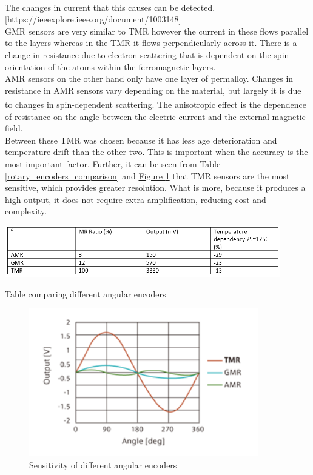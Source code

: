 \documentclass[11pt]{article}		%
\newcommand{\supercite}[1]{\textsuperscript{\cite{#1}}}		%
\newcommand{\figref}[1]{\hyperref[#1]{Figure \ref*{#1}}}    %
\newcommand{\tableref}[1]{\hyperref[#1]{Table \ref*{#1}}}     %
\begin{document}
            The changes in current that this causes can be detected.\supercite{explanation_magntoresistance1} [https://ieeexplore.ieee.org/document/1003148]
            \\
            GMR sensors are very similar to TMR however the current in these flows parallel to the layers whereas in the TMR it flows perpendicularly across it.
            There is a change in resistance due to electron scattering that is dependent on the spin orientation of the atoms within the ferromagnetic layers.
            \\
            AMR sensors on the other hand only have one layer of permalloy. 
            Changes in resistance in AMR sensors vary depending on the material, but largely it is due to changes in spin-dependent scattering.\supercite{explanation_magntoresistance2}
            The anisotropic effect is the dependence of resistance on the angle between the electric current and the external magnetic field.
            \\
            Between these TMR was chosen because it has less age deterioration and temperature drift than the other two.
            This is important when the accuracy is the most important factor. 
            Further, it can be seen from \tableref{rotary_encoders_comparison} and \figref{rotary_encoders_graph} that TMR sensors are the most sensitive, which provides greater resolution. What is more, because it produces a high output, it does not require extra amplification, reducing cost and complexity. 
            
            
            \begin{table}[h]
					\centering
						\includegraphics[width=0.9\textwidth] {table_showing_different_rotary_encoders.PNG}
						\caption{Table comparing different angular encoders}
						\label{rotary_encoders_comparison}
				\end{table}
				
				  \begin{figure}[h]
					\centering
						\includegraphics[width=10cm] {Graph_of_different_rotary_encoders}
						\caption{Sensitivity of different angular encoders \cite{TMR_graph}}
						\label{rotary_encoders_graph}
				\end{figure}
\end{document}
